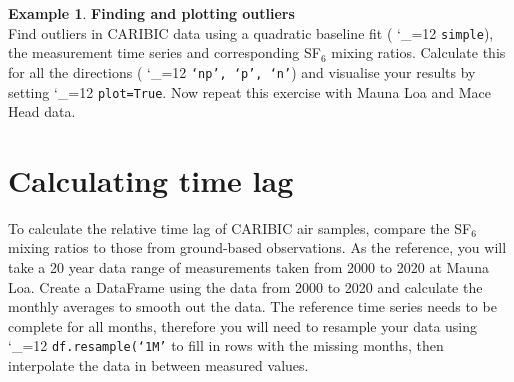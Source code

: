 \documentclass{article}
\makeatletter
\newcommand{\pyf}{%
  \begingroup\catcode`_=12
  \pyf@
}
\newcommand{\pyf@}[1]{\texttt{#1}\endgroup}
\theoremstyle{definition}
\newtheorem{exmp}{Example}[section]
\makeatother
\begin{document}
\begin{exmp}\textbf{Finding and plotting outliers} \\
Find outliers in CARIBIC data using a quadratic baseline fit (\pyf{simple}), the measurement time series and corresponding SF$_6$ mixing ratios. Calculate this for all the directions (\pyf{`np', `p', `n'}) and visualise your results by setting \pyf{plot=True}. Now repeat this exercise with Mauna Loa and Mace Head data. \end{exmp}

\section{Calculating time lag}
To calculate the relative time lag of CARIBIC air samples, compare the SF$_6$ mixing ratios to those from ground-based observations. As the reference, you will take a 20 year data range of measurements taken from 2000 to 2020 at  Mauna Loa. Create a DataFrame using the data from 2000 to 2020 and calculate the monthly averages to smooth out the data. The reference time series needs to be complete for all months, therefore you will need to resample your data using \pyf{df.resample(`1M'} to fill in rows with the missing months, then interpolate the data in between measured values. 

\end{document}
